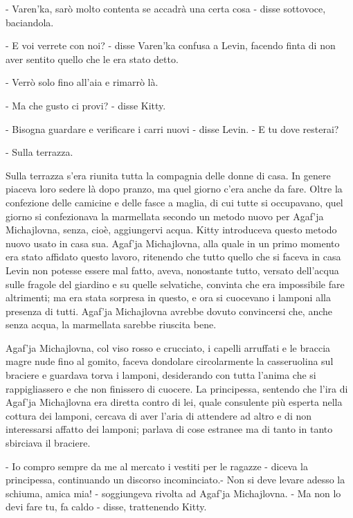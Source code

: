 - Varen'ka, sarò molto contenta se accadrà una certa cosa - disse sottovoce, baciandola. 

- E voi verrete con noi? - disse Varen'ka confusa a Levin, facendo finta di non aver sentito quello che le era stato detto. 

- Verrò solo fino all'aia e rimarrò là. 

- Ma che gusto ci provi? - disse Kitty. 

- Bisogna guardare e verificare i carri nuovi - disse Levin. - E tu dove resterai? 

- Sulla terrazza. 

\label{ii-5} 

Sulla terrazza s'era riunita tutta la compagnia delle donne di casa. In genere piaceva loro sedere là dopo pranzo, ma quel giorno c'era anche da fare. Oltre la confezione delle camicine e delle fasce a maglia, di cui tutte si occupavano, quel giorno si confezionava la marmellata secondo un metodo nuovo per Agaf'ja Michajlovna, senza, cioè, aggiungervi acqua. Kitty introduceva questo metodo nuovo usato in casa sua. Agaf'ja Michajlovna, alla quale in un primo momento era stato affidato questo lavoro, ritenendo che tutto quello che si faceva in casa Levin non potesse essere mal fatto, aveva, nonostante tutto, versato dell'acqua sulle fragole del giardino e su quelle selvatiche, convinta che era impossibile fare altrimenti; ma era stata sorpresa in questo, e ora si cuocevano i lamponi alla presenza di tutti. Agaf'ja Michajlovna avrebbe dovuto convincersi che, anche senza acqua, la marmellata sarebbe riuscita bene. 

Agaf'ja Michajlovna, col viso rosso e crucciato, i capelli arruffati e le braccia magre nude fino al gomito, faceva dondolare circolarmente la casseruolina sul braciere e guardava torva i lamponi, desiderando con tutta l'anima che si rappigliassero e che non finissero di cuocere. La principessa, sentendo che l'ira di Agaf'ja Michajlovna era diretta contro di lei, quale consulente più esperta nella cottura dei lamponi, cercava di aver l'aria di attendere ad altro e di non interessarsi affatto dei lamponi; parlava di cose estranee ma di tanto in tanto sbirciava il braciere. 

- Io compro sempre da me al mercato i vestiti per le ragazze - diceva la principessa, continuando un discorso incominciato.- Non si deve levare adesso la schiuma, amica mia! - soggiungeva rivolta ad Agaf'ja Michajlovna. - Ma non lo devi fare tu, fa caldo - disse, trattenendo Kitty. 


